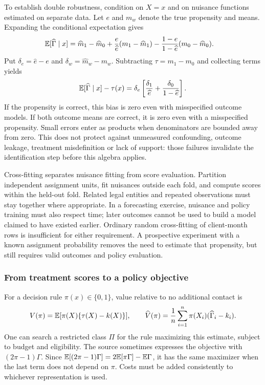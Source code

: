 To establish double robustness, condition on $X=x$ and on nuisance functions estimated on separate data. Let $e$ and $m_w$ denote the true propensity and means. Expanding the conditional expectation gives
\begin{align*}
 \mathbb{E}[\widehat\Gamma\mid x]
 &=\widehat m_1-\widehat m_0
   +\frac{e}{\widehat e}(m_1-\widehat m_1)
   -\frac{1-e}{1-\widehat e}(m_0-\widehat m_0).
\end{align*}
Put $\delta_e=\widehat e-e$ and $\delta_w=\widehat m_w-m_w$. Subtracting $\tau=m_1-m_0$ and collecting terms yields
\begin{equation}
 \mathbb{E}[\widehat\Gamma\mid x]-\tau(x)
 =\delta_e\left[\frac{\delta_1}{\widehat e}
              +\frac{\delta_0}{1-\widehat e}\right].
 \label{eq:dr-bias}
\end{equation}
If the propensity is correct, this bias is zero even with misspecified outcome models. If both outcome means are correct, it is zero even with a misspecified propensity. Small errors enter as products when denominators are bounded away from zero. This does not protect against unmeasured confounding, outcome leakage, treatment misdefinition or lack of support: those failures invalidate the identification step before this algebra applies.

Cross-fitting separates nuisance fitting from score evaluation. Partition independent assignment units, fit nuisances outside each fold, and compute scores within the held-out fold. Related legal entities and repeated observations must stay together where appropriate. In a forecasting exercise, nuisance and policy training must also respect time; later outcomes cannot be used to build a model claimed to have existed earlier. Ordinary random cross-fitting of client-month rows is insufficient for either requirement. A prospective experiment with a known assignment probability removes the need to estimate that propensity, but still requires valid outcomes and policy evaluation.

\subsubsection{From treatment scores to a policy objective}

For a decision rule $\pi(x)\in\{0,1\}$, value relative to no additional contact is
\begin{equation}
 V(\pi)=\mathbb{E}[\pi(X)\{\tau(X)-k(X)\}],\qquad
 \widehat V(\pi)=\frac1n\sum_{i=1}^n\pi(X_i)(\widehat\Gamma_i-k_i).
 \label{eq:policy-learning}
\end{equation}
One can search a restricted class $\Pi$ for the rule maximizing this estimate, subject to budget and eligibility. The source sometimes expresses the objective with $(2\pi-1)\Gamma$. Since $\mathbb{E}[(2\pi-1)\Gamma]=2\mathbb{E}[\pi\Gamma]-\mathbb{E}\Gamma$, it has the same maximizer when the last term does not depend on $\pi$. Costs must be added consistently to whichever representation is used.

